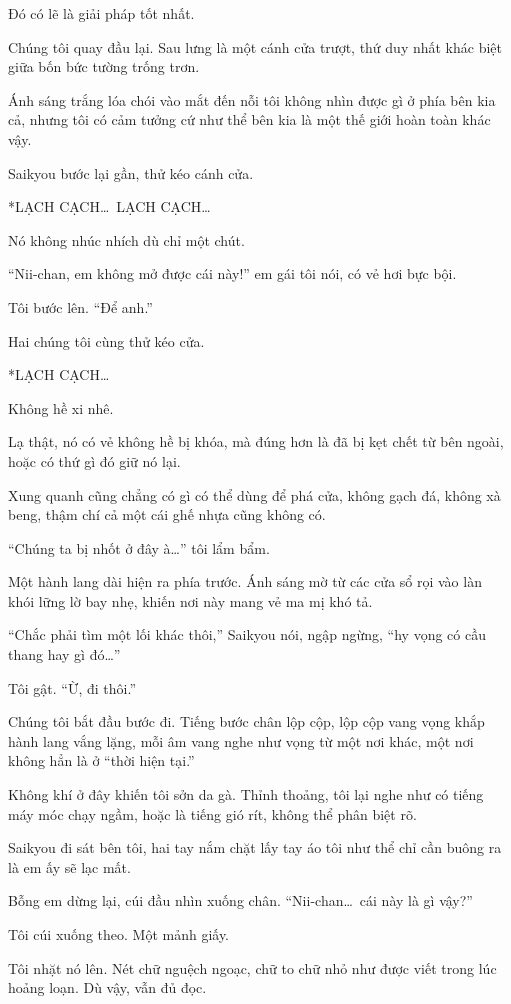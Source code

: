 \documentclass[../main.tex]{subfiles}
\begin{document}
Đó có lẽ là giải pháp tốt nhất.

Chúng tôi quay đầu lại. Sau lưng là một cánh cửa trượt, thứ duy nhất khác biệt giữa bốn bức tường trống trơn.

Ánh sáng trắng lóa chói vào mắt đến nỗi tôi không nhìn được gì ở phía bên kia cả, nhưng tôi có cảm tưởng cứ như thể bên kia là một thế giới hoàn toàn khác vậy.

Saikyou bước lại gần, thử kéo cánh cửa.

*LẠCH CẠCH\dots\ LẠCH CẠCH\dots*

Nó không nhúc nhích dù chỉ một chút.

``Nii-chan, em không mở được cái này!'' em gái tôi nói, có vẻ hơi bực bội.

Tôi bước lên. ``Để anh.''

Hai chúng tôi cùng thử kéo cửa.

*LẠCH CẠCH\dots*

Không hề xi nhê.

Lạ thật, nó có vẻ không hề bị khóa, mà đúng hơn là đã bị kẹt chết từ bên ngoài, hoặc có thứ gì đó giữ nó lại.

Xung quanh cũng chẳng có gì có thể dùng để phá cửa, không gạch đá, không xà beng, thậm chí cả một cái ghế nhựa cũng không có.

``Chúng ta bị nhốt ở đây à\dots'' tôi lẩm bẩm.

Một hành lang dài hiện ra phía trước. Ánh sáng mờ từ các cửa sổ rọi vào làn khói lững lờ bay nhẹ, khiến nơi này mang vẻ ma mị khó tả.

``Chắc phải tìm một lối khác thôi,'' Saikyou nói, ngập ngừng, ``hy vọng có cầu thang hay gì đó\dots''

Tôi gật. ``Ừ, đi thôi.''

Chúng tôi bắt đầu bước đi. Tiếng bước chân lộp cộp, lộp cộp vang vọng khắp hành lang vắng lặng, mỗi âm vang nghe như vọng từ một nơi khác, một nơi không hẳn là ở ``thời hiện tại.''

Không khí ở đây khiến tôi sởn da gà. Thỉnh thoảng, tôi lại nghe như có tiếng máy móc chạy ngầm, hoặc là tiếng gió rít, không thể phân biệt rõ.

Saikyou đi sát bên tôi, hai tay nắm chặt lấy tay áo tôi như thể chỉ cần buông ra là em ấy sẽ lạc mất.

Bỗng em dừng lại, cúi đầu nhìn xuống chân. ``Nii-chan\dots\ cái này là gì vậy?''

Tôi cúi xuống theo. Một mảnh giấy.

Tôi nhặt nó lên. Nét chữ nguệch ngoạc, chữ to chữ nhỏ như được viết trong lúc hoảng loạn. Dù vậy, vẫn đủ đọc.
\end{document}
